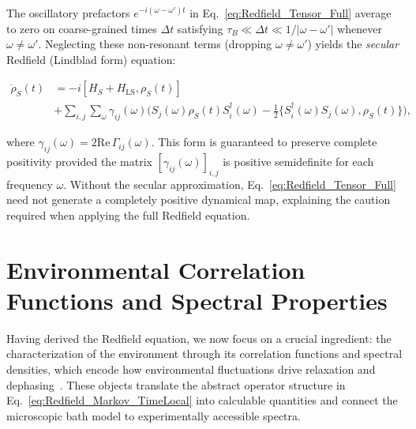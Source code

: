 \noindent
The oscillatory prefactors $e^{-i(\omega - \omega') t}$ in Eq.~\eqref{eq:Redfield_Tensor_Full} average to zero on coarse-grained times $\Delta t$ satisfying $\tau_B \ll \Delta t \ll 1/|\omega - \omega'|$ whenever $\omega \neq \omega'$. Neglecting these non-resonant terms (dropping $\omega \neq \omega'$) yields the \emph{secular} Redfield (Lindblad form) equation:

\begin{align}
	\dot{\rho}_S(t) & = -i [H_S + H_{\text{LS}}, \rho_S(t)]                                                                                                                                     \\
	                & + \sum_{i,j} \sum_{\omega} \gamma_{ij}(\omega) \Big( S_j(\omega) \rho_S(t) S_i^{\dagger}(\omega) - \tfrac{1}{2} \{ S_i^{\dagger}(\omega) S_j(\omega), \rho_S(t) \} \Big),
	\label{eq:Secular_Lindblad_Form}
\end{align}

\noindent
where $\gamma_{ij}(\omega) = 2 \mathrm{Re}\,\Gamma_{ij}(\omega)$. This form is guaranteed to preserve complete positivity provided the matrix $[\gamma_{ij}(\omega)]_{i,j}$ is positive semidefinite for each frequency $\omega$. Without the secular approximation, Eq.~\eqref{eq:Redfield_Tensor_Full} need not generate a completely positive dynamical map, explaining the caution required when applying the full Redfield equation.


\section{Environmental Correlation Functions and Spectral Properties}
\label{sec:environmental_correlation_functions}

\noindent
Having derived the Redfield equation, we now focus on a crucial ingredient: the characterization of the environment through its correlation functions and spectral densities, which encode how environmental fluctuations drive relaxation and dephasing~\cite{breuerpetruccione2009theoryopenquantum, weiss2012quantumdissipativesystems}. These objects translate the abstract operator structure in Eq.~\eqref{eq:Redfield_Markov_TimeLocal} into calculable quantities and connect the microscopic bath model to experimentally accessible spectra.

